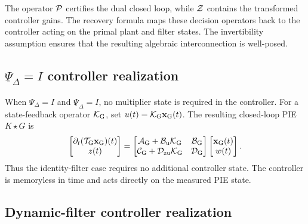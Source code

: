 The operator $\mathcal{P}$ certifies the dual closed loop, while $\mathcal{Z}$ contains
the transformed controller gains. The recovery formula maps these decision
operators back to the controller acting on the primal plant and filter states.
The invertibility assumption ensures that the resulting algebraic
interconnection is well-posed.


\subsection{\texorpdfstring{$\underline{\Psi}_\Delta = I$}
{Dual-filter identity} controller realization}

When $\Psi_\Delta=I$ and $\underline{\Psi}_\Delta=I$, no multiplier state is
required in the controller. For a state-feedback operator $\mathcal{K}_{{\mathrm{G}}}$, set
$u(t)=\mathcal{K}_{{\mathrm{G}}}\mathbf{x}_{{\mathrm{G}}}(t)$. The resulting closed-loop PIE
$K\star G$ is
\begin{equation*}
\begin{bmatrix}\partial_t(\mathcal{T}_{{\mathrm{G}}}\mathbf{x}_{{\mathrm{G}}})(t)\\z(t)\end{bmatrix}
=
\begin{bmatrix}
\mathcal{A}_{{\mathrm{G}}}+\mathcal{B}_{{\mathrm{u}}}\mathcal{K}_{{\mathrm{G}}}&\mathcal{B}_{{\mathrm{G}}}\\
\mathcal{C}_{{\mathrm{G}}}+\mathcal{D}_{{\mathrm{zu}}}\mathcal{K}_{{\mathrm{G}}}&\mathcal{D}_{{\mathrm{G}}}
\end{bmatrix}
\begin{bmatrix}\mathbf{x}_{{\mathrm{G}}}(t)\\w(t)\end{bmatrix}.
\end{equation*}
Thus the identity-filter case requires no additional controller state. The
controller is memoryless in time and acts directly on the measured PIE state.

\subsection{Dynamic-filter controller realization}

